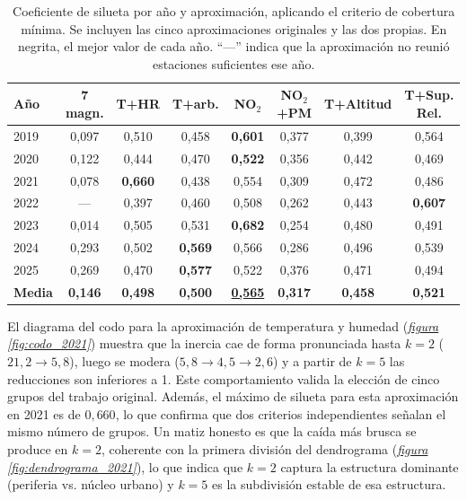 \begin{table}[htbp]
	\centering
	\small
	\begin{tabular}{lccccccc}
		\hline
		\textbf{Año} & \textbf{7 magn.} & \textbf{T+HR} & \textbf{T+arb.} & \textbf{NO$_2$} & \textbf{NO$_2$+PM} & \textbf{T+Altitud} & \textbf{T+Sup. Rel.} \\
		\hline
		2019 & 0,097 & 0,510 & 0,458 & \textbf{0,601} & 0,377 & 0,399 & 0,564 \\
		2020 & 0,122 & 0,444 & 0,470 & \textbf{0,522} & 0,356 & 0,442 & 0,469 \\
		2021 & 0,078 & \textbf{0,660} & 0,438 & 0,554 & 0,309 & 0,472 & 0,486 \\
		2022 & --- & 0,397 & 0,460 & 0,508 & 0,262 & 0,443 & \textbf{0,607} \\
		2023 & 0,014 & 0,505 & 0,531 & \textbf{0,682} & 0,254 & 0,480 & 0,491 \\
		2024 & 0,293 & 0,502 & \textbf{0,569} & 0,566 & 0,286 & 0,496 & 0,539 \\
		2025 & 0,269 & 0,470 & \textbf{0,577} & 0,522 & 0,376 & 0,471 & 0,494 \\
		\hline
		\textbf{Media} & \textbf{0,146} & \textbf{0,498} & \textbf{0,500} & \underline{\textbf{0,565}} & \textbf{0,317} & \textbf{0,458} & \textbf{0,521} \\
		\hline
	\end{tabular}
	\caption{Coeficiente de silueta por año y aproximación, aplicando el criterio de cobertura mínima. Se incluyen las cinco aproximaciones originales y las dos propias. En negrita, el mejor valor de cada año. ``---'' indica que la aproximación no reunió estaciones suficientes ese año.}
	\label{tab:silhouette_anios_propio}
\end{table}

El diagrama del codo para la aproximación de temperatura y humedad (\hyperref[fig:codo_2021]{\textit{figura \ref*{fig:codo_2021}}}) muestra que la inercia cae de forma pronunciada hasta $k=2$ ($21,2 \to 5,8$), luego se modera ($5,8 \to 4,5 \to 2,6$) y a partir de $k=5$ las reducciones son inferiores a 1. Este comportamiento valida la elección de cinco grupos del trabajo original. Además, el máximo de silueta para esta aproximación en 2021 es de $0,660$, lo que confirma que dos criterios independientes señalan el mismo número de grupos. Un matiz honesto es que la caída más brusca se produce en $k=2$, coherente con la primera división del dendrograma (\hyperref[fig:dendrograma_2021]{\textit{figura \ref*{fig:dendrograma_2021}}}), lo que indica que $k=2$ captura la estructura dominante (periferia vs. núcleo urbano) y $k=5$ es la subdivisión estable de esa estructura.

